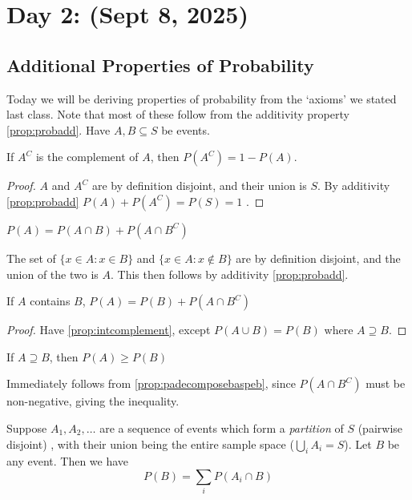 \section{Day 2: (Sept 8, 2025)}

\subsection{Additional Properties of Probability}
Today we will be deriving properties of probability from the `axioms' we stated last class. Note that most of these follow from the additivity property \ref{prop:probadd}. Have $A, B \subseteq S$ be events.
\begin{simplethm}
    If $A^C$ is the complement of $A$, then $P(A^C) = 1 - P(A)$. \label{prop:pcomplement}
\end{simplethm}
\begin{proof}
    $A$ and $A^C$ are by definition disjoint, and their union is $S$. By additivity \ref{prop:probadd} $P(A) + P(A^C) = P(S) = 1$ .
\end{proof}
\begin{simplethm}
    $P(A) = P(A \cap B) + P(A \cap B^C)$ \label{prop:intcomplement} 
\end{simplethm}
The set of $\{ x \in A : x \in B \}$ and $\{ x \in A : x \not \in B \}$ are by definition disjoint, and the union of the two is $A$. This then follows by additivity \ref{prop:probadd}.
\begin{simplethm}
    If $A$ contains $B$, $P(A) = P(B) + P(A \cap B^C)$ \label{prop:padecomposebaspeb}
\end{simplethm}
\begin{proof}
    Have \ref{prop:intcomplement}, except $P(A \cup B) = P(B)$ where $A \supseteq B$.
\end{proof}
\begin{simplethm}[Monotonicity]
    If $A \supseteq B$, then $P(A) \geq P(B)$
\end{simplethm}
Immediately follows from \ref{prop:padecomposebaspeb}, since $P(A \cap B^C)$ must be non-negative, giving the inequality. 

\begin{theorem}
    Suppose $A_1, A_2, \dots$ are a sequence of events which form a \textit{partition} of $S$ (pairwise disjoint) , with their union being the entire sample space ($\bigcup_i A_i = S$). Let $B$ be any event. Then we have
    \[
    P(B) = \sum_i P(A_i \cap B)
    \]
\end{theorem}

